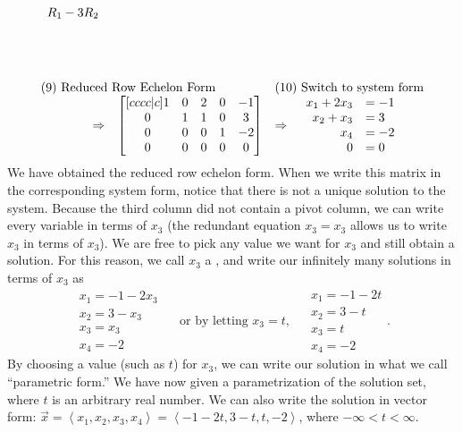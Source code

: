 \begin{example}
{$$\begin{array}{rlcl}
  \begin{array}{lr} R_1-3R_2 \\ \ \\ \ \\ \ \end{array}
\\ \\ 
\multicolumn{2}{l}{\text{(9) Reduced Row Echelon Form}}&
\multicolumn{2}{l}{\text{(10) Switch to system form}}\\
\Rightarrow&
\begin{bmatrix}[cccc|c]
  1 & 0 & 2 & 0 & -1 \\
 0 & 1 & 1 & 0 & 3 \\
 0 & 0 & 0 & 1 & -2 \\
 0 & 0 & 0 & 0 & 0
\end{bmatrix}
&\Rightarrow& 
\begin{array}{rl}
x_1+2x_3&=-1\\
x_2+x_3&=3\\
x_4&=-2\\
0&=0
\end{array}
\end{array}
$$}We have obtained the reduced row echelon form. 
When we write this matrix in the corresponding system form, notice that there is not a unique solution to the system. Because the third column did not contain a pivot column, we can write every variable in terms of $x_3$ (the redundant equation $x_3=x_3$ allows us to write $x_3$ in terms of $x_3$). We are free to pick any value we want for $x_3$ and still obtain a solution. For this reason, we call $x_3$ a ,  and write our infinitely many solutions in terms of $x_3$ as 
$$
\begin{array}{ll}
x_1=-1-2x_3\\
x_2=3-x_3\\
x_3=x_3\\
x_4=-2
\end{array}
\quad \text{ or by letting $x_3=t$, }\quad
\begin{array}{ll}
x_1=-1-2t\\
x_2=3-t\\
x_3=t\\
x_4=-2
\end{array}
.
$$
By choosing a value (such as $t$) for $x_3$, we can write our solution in what we call ``parametric form.'' We have now given a parametrization of the solution set, where $t$ is an arbitrary real number.  We can also write the solution in vector form: $\vec x=\left<x_1,x_2,x_3,x_4\right>=\left< -1-2t, 3-t, t, -2\right>$, where $-\infty<t<\infty$. 
\end{example}

